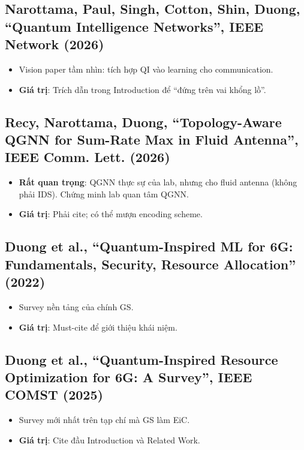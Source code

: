 \documentclass[11pt,a4paper]{article}
\begin{document}
\subsection{Narottama, Paul, Singh, Cotton, Shin, \textbf{Duong}, ``Quantum Intelligence Networks'', IEEE Network (2026)}
\begin{itemize}
  \item Vision paper tầm nhìn: tích hợp QI vào learning cho communication.
  \item \textbf{Giá trị}: Trích dẫn trong Introduction để ``đứng trên vai khổng lồ''.
\end{itemize}

\subsection{Recy, Narottama, \textbf{Duong}, ``Topology-Aware QGNN for Sum-Rate Max in Fluid Antenna'', IEEE Comm. Lett. (2026)}
\begin{itemize}
  \item \textbf{Rất quan trọng}: QGNN thực sự của lab, nhưng cho fluid antenna (không phải IDS). Chứng minh lab quan tâm QGNN.
  \item \textbf{Giá trị}: Phải cite; có thể mượn encoding scheme.
\end{itemize}

\subsection{Duong et al., ``Quantum-Inspired ML for 6G: Fundamentals, Security, Resource Allocation'' (2022)}
\begin{itemize}
  \item Survey nền tảng của chính GS.
  \item \textbf{Giá trị}: Must-cite để giới thiệu khái niệm.
\end{itemize}

\subsection{Duong et al., ``Quantum-Inspired Resource Optimization for 6G: A Survey'', IEEE COMST (2025)}
\begin{itemize}
  \item Survey mới nhất trên tạp chí mà GS làm EiC.
  \item \textbf{Giá trị}: Cite đầu Introduction và Related Work.
\end{itemize}
\end{document}
